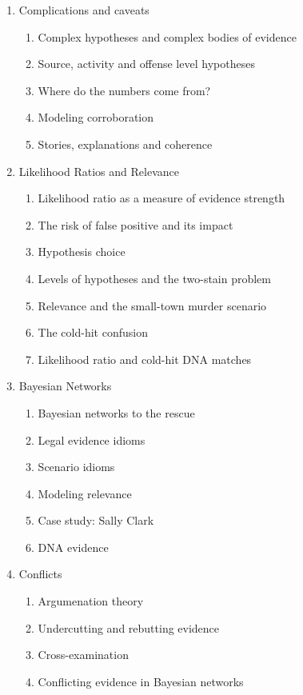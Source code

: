 \documentclass[10pt,dvipsnames,enabledeprecatedfontcommands]{scrartcl}
\begin{document}
\begin{enumerate}
\begin{enumerate}
  
  
  \item  Complications and caveats
  \begin{enumerate}
  \item  Complex hypotheses and complex bodies of evidence
  \item Source, activity and offense level hypotheses
  \item  Where do the numbers come from?
  \item  Modeling corroboration
  \item  Stories, explanations and coherence
  \end{enumerate}

  
  \item  Likelihood Ratios and Relevance
  \begin{enumerate}
  \item Likelihood ratio as a measure of evidence strength
  \item The risk of false positive and its impact
  \item Hypothesis choice
  \item Levels of hypotheses and the two-stain problem
  \item Relevance and the small-town murder scenario
  \item The cold-hit confusion
  \item  Likelihood ratio and  cold-hit DNA matches
  \end{enumerate}



  \item  Bayesian Networks
  \begin{enumerate}
  \item  Bayesian networks to the rescue
  \item  Legal evidence idioms
  \item Scenario idioms
  \item Modeling relevance
  \item  Case study: Sally Clark
  \item DNA evidence
  \end{enumerate}
  
  \item Conflicts
  \begin{enumerate}
  \item Argumenation theory
  \item Undercutting and rebutting evidence
  \item Cross-examination
  \item Conflicting evidence in Bayesian networks
  \end{enumerate}
 

\end{enumerate}
\end{enumerate}
\end{document}
